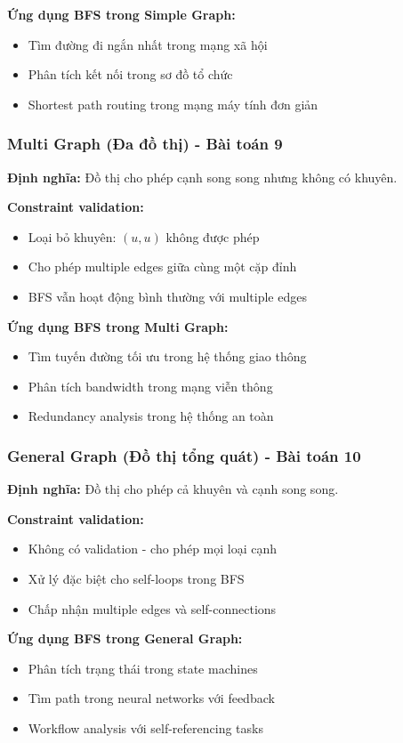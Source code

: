 \documentclass[12pt]{article}
\begin{document}
\textbf{Ứng dụng BFS trong Simple Graph:}
\begin{itemize}
    \item Tìm đường đi ngắn nhất trong mạng xã hội
    \item Phân tích kết nối trong sơ đồ tổ chức
    \item Shortest path routing trong mạng máy tính đơn giản
\end{itemize}

\subsubsection*{Multi Graph (Đa đồ thị) - Bài toán 9}
\textbf{Định nghĩa:} Đồ thị cho phép cạnh song song nhưng không có khuyên.

\textbf{Constraint validation:}
\begin{itemize}
    \item Loại bỏ khuyên: $(u, u)$ không được phép
    \item Cho phép multiple edges giữa cùng một cặp đỉnh
    \item BFS vẫn hoạt động bình thường với multiple edges
\end{itemize}

\textbf{Ứng dụng BFS trong Multi Graph:}
\begin{itemize}
    \item Tìm tuyến đường tối ưu trong hệ thống giao thông
    \item Phân tích bandwidth trong mạng viễn thông
    \item Redundancy analysis trong hệ thống an toàn
\end{itemize}

\subsubsection*{General Graph (Đồ thị tổng quát) - Bài toán 10}
\textbf{Định nghĩa:} Đồ thị cho phép cả khuyên và cạnh song song.

\textbf{Constraint validation:}
\begin{itemize}
    \item Không có validation - cho phép mọi loại cạnh
    \item Xử lý đặc biệt cho self-loops trong BFS
    \item Chấp nhận multiple edges và self-connections
\end{itemize}

\textbf{Ứng dụng BFS trong General Graph:}
\begin{itemize}
    \item Phân tích trạng thái trong state machines
    \item Tìm path trong neural networks với feedback
    \item Workflow analysis với self-referencing tasks
\end{itemize}
\end{document}
